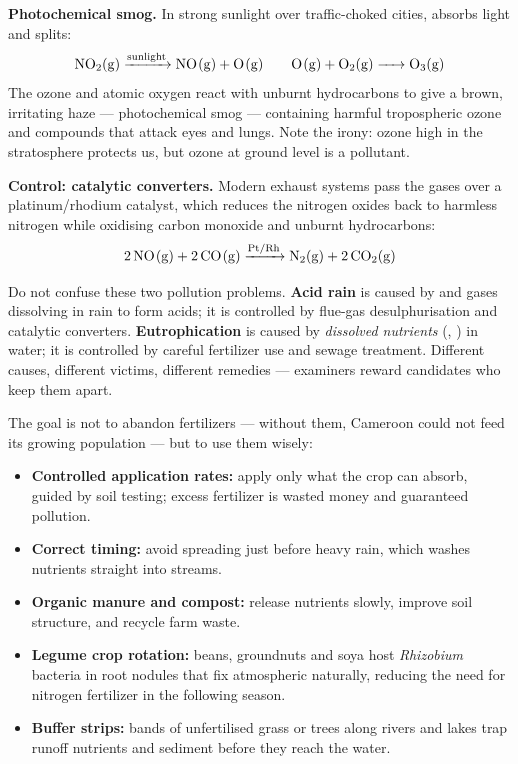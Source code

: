 \documentclass[11pt]{article}
\newcommand{\cle}[1]{{\popxbold\color{popdark}#1}}
\newcounter{popsec}
\newcounter{popsub}
\newcommand{\courssub}[1]{%
  \stepcounter{popsub}%
  \par\vspace{9pt}\noindent{\popxbold\fontsize{11.5}{13}\selectfont\color{popink}{\color{poporange}\thepopsec.\thepopsub}\hspace{6pt}#1}\par\nopagebreak\vspace{4pt}
}
\begin{document}
\textbf{Photochemical smog.} In strong sunlight over traffic-choked cities,  absorbs light and splits:
\[ \ce{NO2(g) ->[sunlight] NO(g) + O(g)} \qquad \ce{O(g) + O2(g) -> O3(g)} \]
The ozone and atomic oxygen react with unburnt hydrocarbons to give a brown, irritating haze — \cle{photochemical smog} — containing harmful \cle{tropospheric ozone} and compounds that attack eyes and lungs. Note the irony: ozone high in the stratosphere protects us, but ozone at ground level is a pollutant.

\textbf{Control: catalytic converters.} Modern exhaust systems pass the gases over a platinum/rhodium catalyst, which reduces the nitrogen oxides back to harmless nitrogen while oxidising carbon monoxide and unburnt hydrocarbons:
\[ \ce{2NO(g) + 2CO(g) ->[Pt/Rh] N2(g) + 2CO2(g)} \]

\begin{attention}
Do not confuse these two pollution problems. \textbf{Acid rain} is caused by  and  gases dissolving in rain to form acids; it is controlled by flue-gas desulphurisation and catalytic converters. \textbf{Eutrophication} is caused by \emph{dissolved nutrients} (, ) in water; it is controlled by careful fertilizer use and sewage treatment. Different causes, different victims, different remedies — examiners reward candidates who keep them apart.
\end{attention}

\courssub{Sustainable Use of Fertilizers}

The goal is not to abandon fertilizers — without them, Cameroon could not feed its growing population — but to use them wisely:

\begin{itemize}
\item \textbf{Controlled application rates:} apply only what the crop can absorb, guided by soil testing; excess fertilizer is wasted money and guaranteed pollution.
\item \textbf{Correct timing:} avoid spreading just before heavy rain, which washes nutrients straight into streams.
\item \textbf{Organic manure and compost:} release nutrients slowly, improve soil structure, and recycle farm waste.
\item \textbf{Legume crop rotation:} beans, groundnuts and soya host \emph{Rhizobium} bacteria in root nodules that fix atmospheric  naturally, reducing the need for nitrogen fertilizer in the following season.
\item \textbf{Buffer strips:} bands of unfertilised grass or trees along rivers and lakes trap runoff nutrients and sediment before they reach the water.
\end{itemize}
\end{document}
